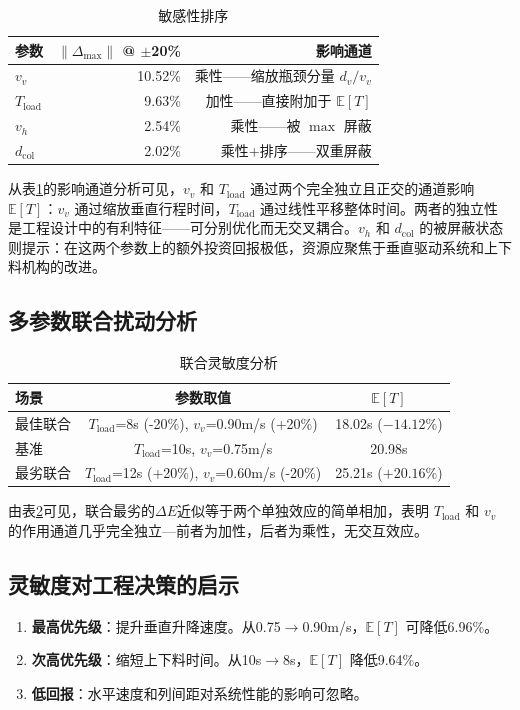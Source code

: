 \documentclass[a4paper]{cumcmthesis}
\newcommand{\headcol}{\rowcolor{tableheadcolor}}
\newcommand{\E}[1]{\mathbb{E}\left[#1\right]}
\begin{document}
\begin{table}[htbp]
\centering\small
\caption{敏感性排序}
\label{tab:tornado}
\begin{tabular}{lrr}
\toprule
\headcol 参数 & $\|\Delta_{\max}\|$ @ $\pm$20\% & 影响通道 \\
\midrule
$v_v$ & 10.52\% & 乘性——缩放瓶颈分量 $d_v/v_v$ \\
$T_{\text{load}}$ & 9.63\% & 加性——直接附加于 $\mathbb{E}[T]$ \\
$v_h$ & 2.54\% & 乘性——被 $\max$ 屏蔽 \\
$d_{\text{col}}$ & 2.02\% & 乘性+排序——双重屏蔽 \\
\bottomrule
\end{tabular}
\end{table}

从表\ref{tab:tornado}的影响通道分析可见，$v_v$ 和 $T_{\text{load}}$ 通过两个完全独立且正交的通道影响 $\mathbb{E}[T]$：$v_v$ 通过缩放垂直行程时间，$T_{\text{load}}$ 通过线性平移整体时间。两者的独立性是工程设计中的有利特征——可分别优化而无交叉耦合。$v_h$ 和 $d_{\text{col}}$ 的被屏蔽状态则提示：在这两个参数上的额外投资回报极低，资源应聚焦于垂直驱动系统和上下料机构的改进。

\subsection{多参数联合扰动分析}

\begin{table}[htbp]
\centering\small
\caption{联合灵敏度分析}
\label{tab:joint}
\begin{tabular}{lcc}
\toprule
\headcol 场景 & 参数取值 & $\E{T}$ \\
\midrule
最佳联合 & $T_{\text{load}}$=8s (-20\%), $v_v$=0.90m/s (+20\%) & 18.02s ($-14.12\%$) \\
基准 & $T_{\text{load}}$=10s, $v_v$=0.75m/s & 20.98s \\
最劣联合 & $T_{\text{load}}$=12s (+20\%), $v_v$=0.60m/s (-20\%) & 25.21s ($+20.16\%$) \\
\bottomrule
\end{tabular}
\end{table}

由表\ref{tab:joint}可见，联合最劣的$\Delta E$近似等于两个单独效应的简单相加，表明 $T_{\text{load}}$ 和 $v_v$ 的作用通道几乎完全独立---前者为加性，后者为乘性，无交互效应。

\subsection{灵敏度对工程决策的启示}
\begin{enumerate}[(1)]
\item \textbf{最高优先级}：提升垂直升降速度。从0.75$\to$0.90m/s，$\E{T}$ 可降低6.96\%。
\item \textbf{次高优先级}：缩短上下料时间。从10s$\to$8s，$\E{T}$ 降低9.64\%。
\item \textbf{低回报}：水平速度和列间距对系统性能的影响可忽略。
\end{enumerate}
\end{document}

